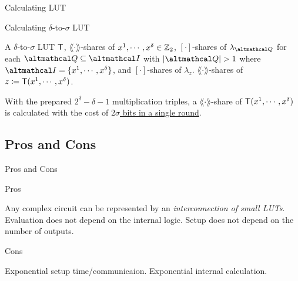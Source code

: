 \documentclass[../240906_cryptlab_flute.tex]{subfiles}
\begin{document}
\begin{frame}{Calculating LUT}
    \begin{block}{Calculating \(\delta\)-to-\(\sigma\) LUT}
        \begin{description}[Output]
            \ii[Input]
            A \(\delta\)-to-\(\sigma\) LUT \(\mathsf{T}\),
            \(\lang\cdot\rang\)-shares of \(x^1, \cdots, x^\delta \in \mathbb{Z}_2\),
            \([\cdot]\)-shares of \(\lambda_{\mcal{Q}}\) for each \(\mcal{Q} \subseteq \mcal{I}\)
            with \(|\mcal{Q}| > 1\) where \(\mcal{I} = \{x^1,\cdots,x^\delta\}\), and
            \([\cdot]\)-shares of \(\lambda_z\).
            \ii[Output]
            \(\lang\cdot\rang\)-shares of \(z \coloneqq \mathsf{T}(x^1, \cdots, x^\delta)\).
        \end{description}
        With the prepared \(2^\delta - \delta - 1\) multiplication triples,
        a \(\lang\cdot\rang\)-share of \(\mathsf{T}(x^1, \cdots, x^\delta)\)
        is calculated with the cost of \ul{\(2\sigma\) bits in a single round}.
    \end{block}
\end{frame}

\subsection{Pros and Cons}
\begin{frame}{Pros and Cons}
    \begin{block}{Pros}
        \begin{itemize}
            \ii Any complex circuit can be represented by an \emph{interconnection of small LUTs}.
            \ii Evaluation does not depend on the internal logic.
            \ii Setup does not depend on the number of outputs.
        \end{itemize}
    \end{block}
    \pause
    \begin{block}{Cons}
        \begin{itemize}
            \ii Exponential setup time/communicaion.
            \ii Exponential internal calculation.
        \end{itemize}
    \end{block}
\end{frame}
\end{document}
